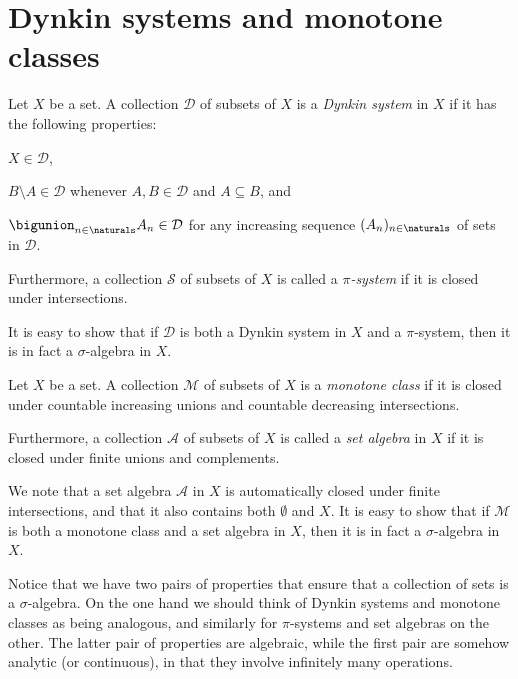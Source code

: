 \documentclass[article, a4paper, 11pt, oneside]{memoir}
\numberwithin{equation}{chapter}
\newcommand{\calD}{\mathcal{D}}
\newcommand{\calM}{\mathcal{M}}
\newcommand{\calA}{\mathcal{A}}
\newcommand{\calS}{\mathcal{S}}
\begin{document}
\chapter{Dynkin systems and monotone classes}

\begin{definition}
    Let $X$ be a set. A collection $\calD$ of subsets of $X$ is a \emph{Dynkin system} in $X$ if it has the following properties:
    \begin{enumdef}
        \item $X \in \calD$,
        \item $B \setminus A \in \calD$ whenever $A,B \in \calD$ and $A \subseteq B$, and
        \item $\bigunion_{n\in\naturals} A_n \in \calD$ for any increasing sequence $(A_n)_{n\in\naturals}$ of sets in $\calD$.
    \end{enumdef}
    Furthermore, a collection $\calS$ of subsets of $X$ is called a \emph{$\pi$-system} if it is closed under intersections.
\end{definition}
%
It is easy to show that if $\calD$ is both a Dynkin system in $X$ and a $\pi$-system, then it is in fact a $\sigma$-algebra in $X$.

\begin{definition}
    Let $X$ be a set. A collection $\calM$ of subsets of $X$ is a \emph{monotone class} if it is closed under countable increasing unions and countable decreasing intersections.

    Furthermore, a collection $\calA$ of subsets of $X$ is called a \emph{set algebra} in $X$ if it is closed under finite unions and complements.
\end{definition}
%
We note that a set algebra $\calA$ in $X$ is automatically closed under finite intersections, and that it also contains both $\emptyset$ and $X$. It is easy to show that if $\calM$ is both a monotone class and a set algebra in $X$, then it is in fact a $\sigma$-algebra in $X$.

Notice that we have two pairs of properties that ensure that a collection of sets is a $\sigma$-algebra. On the one hand we should think of Dynkin systems and monotone classes as being analogous, and similarly for $\pi$-systems and set algebras on the other. The latter pair of properties are algebraic, while the first pair are somehow analytic (or continuous), in that they involve infinitely many operations.
\end{document}

